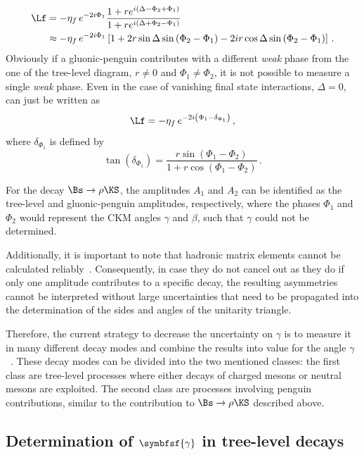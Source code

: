 \begin{align}
\Lf&=-\eta_f\,e^{-2i\Phi_1}\frac{1+re^{i\left(\Delta-\Phi_2+\Phi_1\right)}}{1+re^{i\left(\Delta+\Phi_2-\Phi_1\right)}}\nonumber\\
&\approx-\eta_f\,e^{-2i\Phi_1}\left[1+2r\sin\Delta\sin\left(\Phi_2-\Phi_1\right)-2ir\cos\Delta\sin\left(\Phi_2-\Phi_1\right)\right]\,.
\end{align}
Obviously if a gluonic-penguin contributes with a different \emph{weak} phase from the one of the tree-level diagram, \ie $r\neq0$ and $\Phi_1\neq\Phi_2$, it is not possible to measure a single \emph{weak} phase.
Even in the case of vanishing final state interactions, \ie $\Delta=0$, \Lf can just be written as
\begin{equation}
\Lf=-\eta_f\,e^{-2i\left(\Phi_1-\delta_{\Phi_1}\right)}\,,
\end{equation}
where $\delta_{\Phi_1}$ is defined by
\begin{equation}
\tan\left(\delta_{\Phi_1}\right)=\frac{r\sin\left(\Phi_1-\Phi_2\right)}{1+r\cos\left(\Phi_1-\Phi_2\right)}\,.
\end{equation}

For the decay \mbox{$\Bs\to\rho\KS$}, the amplitudes $A_1$ and $A_2$ can be identified as the tree-level and gluonic-penguin amplitudes, respectively, where the phases $\Phi_1$ and $\Phi_2$ would represent the CKM angles $\gamma$ and $\beta$, such that $\gamma$ could not be determined.

Additionally, it is important to note that hadronic matrix elements cannot be calculated reliably~\cite{Branco:396964}.
Consequently, in case they do not cancel out as they do if only one amplitude contributes to a specific decay, the resulting \CP asymmetries cannot be interpreted without large uncertainties that need to be propagated into the determination of the sides and angles of the unitarity triangle.

Therefore, the current strategy to decrease the uncertainty on $\gamma$ is to measure it in many different decay modes and combine the results into value for the angle $\gamma$~\cite{GammCombo}.
These decay modes can be divided into the two mentioned classes: the first class are tree-level processes where either decays of charged \B mesons or neutral \B mesons are exploited.
The second class are processes involving penguin contributions, similar to the contribution to $\Bs\to\rho\KS$ described above.

\subsection[head={Determination of $\gamma$ in tree-level decays},tocentry={Determination of $\gamma$ in tree-level decays}]{Determination of $\symbfsf{\gamma}$ in tree-level decays}
\label{sec:gamamInTrees}

